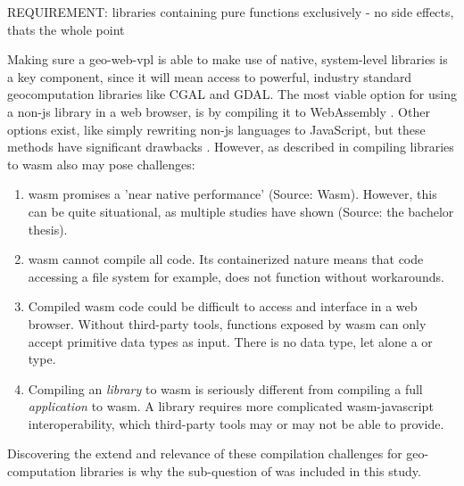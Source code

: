 \begin{note}
  REQUIREMENT: libraries containing pure functions exclusively
  - no side effects, thats the whole point  
\end{note}


Making sure a \ac{geo-web-vpl} is able to make use of native, system-level libraries is a key component, since it will mean access to powerful, industry standard geocomputation libraries like CGAL and GDAL. 
The most viable option for using a non-js library in a web browser, is by compiling it to WebAssembly \cite{haas_bringing_2017}.
Other options exist, like simply rewriting non-js languages to JavaScript, but these methods have significant drawbacks \cite{haas_bringing_2017,jangda_not_2019}.
However, as described in  compiling libraries to \ac{wasm} also may pose challenges:


\begin{enumerate}[-]
  \item \ac{wasm} promises a 'near native performance' (Source: Wasm). However, this can be quite situational, as multiple studies have shown \cite{jangda_not_2019} (Source: the bachelor thesis). 
  \item \ac{wasm} cannot compile all code. Its containerized nature means that code accessing a file system for example, does not function without workarounds. 
  \item Compiled \ac{wasm} code could be difficult to access and interface in a web browser. Without third-party tools, functions exposed by \ac{wasm} can only accept primitive data types as input. There is no  data type, let alone a  or  type. 
  \item Compiling an \emph{library} to \ac{wasm} is seriously different from compiling a full \emph{application} to wasm. A library requires more complicated wasm-javascript interoperability, which third-party tools may or may not be able to provide.
\end{enumerate}
Discovering the extend and relevance of these compilation challenges for geo-computation libraries is why the sub-question of \mySubRQTwoTitle \space was included in this study. 

